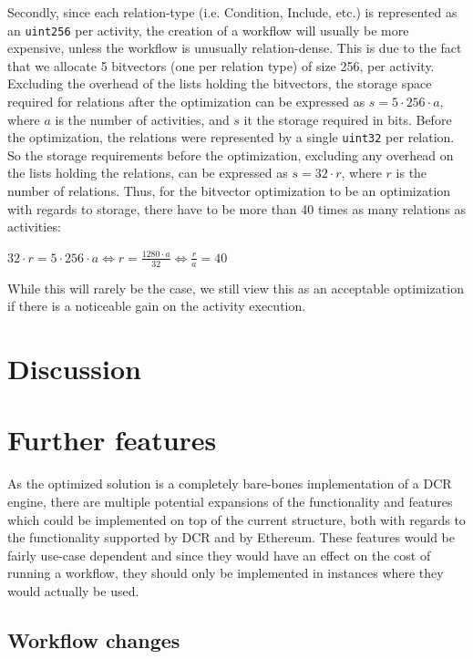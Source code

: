 \documentclass{article}
\begin{document}
		Secondly, since each relation-type (i.e. Condition, Include, etc.) is represented as an \texttt{uint256} per activity, the creation of a workflow will usually be more expensive, unless the workflow is unusually relation-dense. 
		This is due to the fact that we allocate 5 bitvectors (one per relation type) of size 256, per activity. 
		Excluding the overhead of the lists holding the bitvectors, the storage space required for relations after the optimization can be expressed as $s = 5 \cdot 256 \cdot a$, where $a$ is the number of activities, and $s$ it the storage required in bits.
		Before the optimization, the relations were represented by a single \texttt{uint32} per relation.
		So the storage requirements before the optimization, excluding any overhead on the lists holding the relations, can be expressed as $s = 32 \cdot r$, where $r$ is the number of relations.
		Thus, for the bitvector optimization to be an optimization with regards to storage, there have to be more than 40 times as many relations as activities:

		\begin{center}		
			$32 \cdot r = 5 \cdot 256 \cdot a \iff r = \frac{1280 \cdot a}{32} \iff \frac{r}{a} = 40$
		\end{center}
		
		While this will rarely be the case, we still view this as an acceptable optimization if there is a noticeable gain on the activity execution.

	\section{Discussion}

	\section{Further features}
	As the optimized solution is a completely bare-bones implementation of a DCR engine, there are multiple potential expansions of the functionality and features which could be implemented on top of the current structure, both with regards to the functionality supported by DCR and by Ethereum.
	These features would be fairly use-case dependent and since they would have an effect on the cost of running a workflow, they should only be implemented in instances where they would actually be used.

		\subsection{Workflow changes}
		\label{sec:workflow-changes}
\end{document}
